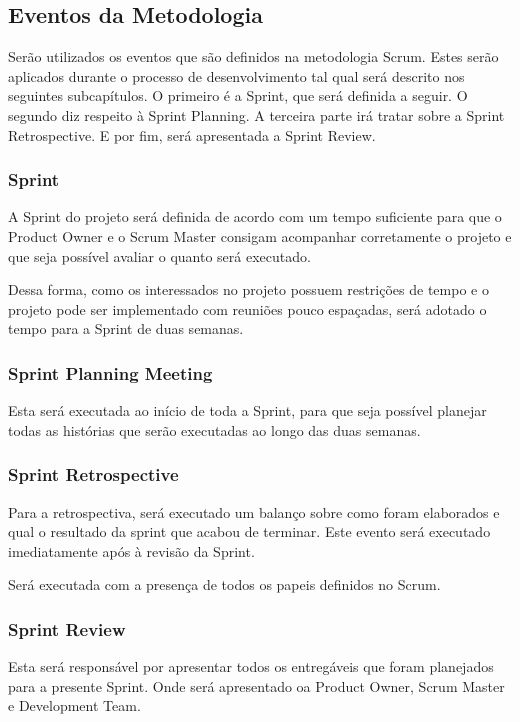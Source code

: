 \subsection{Eventos da Metodologia}
\label{subsec:eventosdametodologia}
Serão utilizados os eventos que são definidos na metodologia Scrum. Estes serão aplicados
durante o processo de desenvolvimento tal qual será descrito nos seguintes subcapítulos.
O primeiro é a Sprint, que será definida a seguir.
O segundo diz respeito à Sprint Planning. A terceira parte irá tratar sobre a Sprint Retrospective.
E por fim, será apresentada a Sprint Review.

\subsubsection{Sprint}
\label{subsec:sprint}
A Sprint do projeto será definida de acordo com um tempo suficiente para que o Product Owner e o 
Scrum Master consigam acompanhar corretamente o projeto e que seja possível avaliar o quanto
será executado.

Dessa forma, como os interessados no projeto possuem restrições de tempo e o projeto pode
ser implementado com reuniões pouco espaçadas, será adotado o tempo para a Sprint de duas
semanas.


\subsubsection{Sprint Planning Meeting}
\label{subsec:sprintplanningmeeting}
Esta será executada ao início de toda a Sprint, para que seja possível planejar
todas as histórias que serão executadas ao longo das duas semanas. 

\subsubsection{Sprint Retrospective}
\label{subsec:sprintplanningmeeting}
Para a retrospectiva, será executado um balanço sobre como foram elaborados e qual o resultado
da sprint que acabou de terminar. Este evento será executado imediatamente após à
revisão da Sprint. 

Será executada com a presença de todos os papeis definidos no Scrum.


\subsubsection{Sprint Review}
\label{subsec:sprintreview}
Esta será responsável por apresentar todos os entregáveis que foram planejados para a presente
Sprint. Onde será apresentado oa Product Owner, Scrum Master e Development Team.

